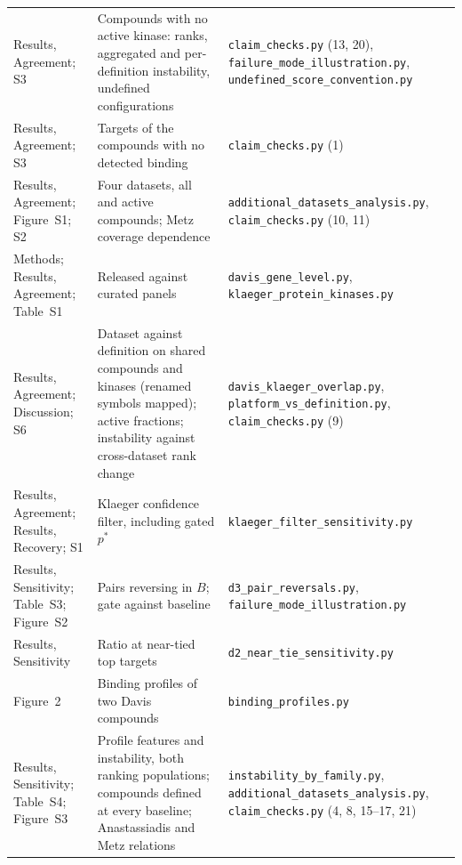 \documentclass[11pt]{article}
\begin{document}
\begin{longtable}{>{\raggedright\arraybackslash}p{}>{\raggedright\arraybackslash}p{}>{\raggedright\arraybackslash}p{}}
Results, Agreement; S3 & Compounds with no active kinase: ranks, aggregated and per-definition instability, undefined configurations & \texttt{claim\_\allowbreak{}checks.py} (13, 20), \texttt{failure\_\allowbreak{}mode\_\allowbreak{}illustration.py}, \texttt{undefined\_\allowbreak{}score\_\allowbreak{}convention.py} \\
Results, Agreement; S3 & Targets of the compounds with no detected binding & \texttt{claim\_\allowbreak{}checks.py} (1) \\
Results, Agreement; Figure~S1; S2 & Four datasets, all and active compounds; Metz coverage dependence & \texttt{additional\_\allowbreak{}datasets\_\allowbreak{}analysis.py}, \texttt{claim\_\allowbreak{}checks.py} (10, 11) \\
Methods; Results, Agreement; Table~S1 & Released against curated panels & \texttt{davis\_\allowbreak{}gene\_\allowbreak{}level.py}, \texttt{klaeger\_\allowbreak{}protein\_\allowbreak{}kinases.py} \\
Results, Agreement; Discussion; S6 & Dataset against definition on shared compounds and kinases (renamed symbols mapped); active fractions; instability against cross-dataset rank change & \texttt{davis\_\allowbreak{}klaeger\_\allowbreak{}overlap.py}, \texttt{platform\_\allowbreak{}vs\_\allowbreak{}definition.py}, \texttt{claim\_\allowbreak{}checks.py} (9) \\
Results, Agreement; Results, Recovery; S1 & Klaeger confidence filter, including gated $p^*$ & \texttt{klaeger\_\allowbreak{}filter\_\allowbreak{}sensitivity.py} \\
Results, Sensitivity; Table~S3; Figure~S2 & Pairs reversing in $B$; gate against baseline & \texttt{d3\_\allowbreak{}pair\_\allowbreak{}reversals.py}, \texttt{failure\_\allowbreak{}mode\_\allowbreak{}illustration.py} \\
Results, Sensitivity & Ratio at near-tied top targets & \texttt{d2\_\allowbreak{}near\_\allowbreak{}tie\_\allowbreak{}sensitivity.py} \\
Figure~2 & Binding profiles of two Davis compounds & \texttt{binding\_\allowbreak{}profiles.py} \\
Results, Sensitivity; Table~S4; Figure~S3 & Profile features and instability, both ranking populations; compounds defined at every baseline; Anastassiadis and Metz relations & \texttt{instability\_\allowbreak{}by\_\allowbreak{}family.py}, \texttt{additional\_\allowbreak{}datasets\_\allowbreak{}analysis.py}, \texttt{claim\_\allowbreak{}checks.py} (4, 8, 15--17, 21) \\

\end{longtable}
\end{document}
